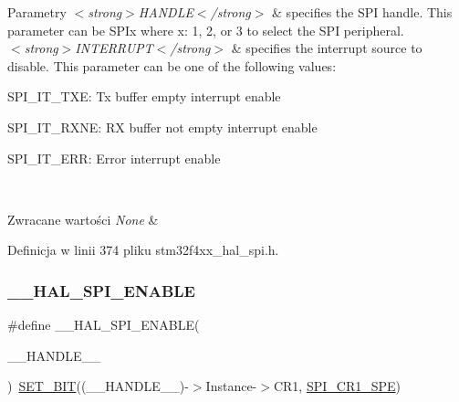 \begin{DoxyParams}{Parametry}
{\em $<$strong$>$\+H\+A\+N\+D\+L\+E$<$/strong$>$} & specifies the S\+PI handle. This parameter can be S\+P\+Ix where x\+: 1, 2, or 3 to select the S\+PI peripheral. \\
\hline
{\em $<$strong$>$\+I\+N\+T\+E\+R\+R\+U\+P\+T$<$/strong$>$} & specifies the interrupt source to disable. This parameter can be one of the following values\+: \begin{DoxyItemize}
\item S\+P\+I\+\_\+\+I\+T\+\_\+\+T\+XE\+: Tx buffer empty interrupt enable \item S\+P\+I\+\_\+\+I\+T\+\_\+\+R\+X\+NE\+: RX buffer not empty interrupt enable \item S\+P\+I\+\_\+\+I\+T\+\_\+\+E\+RR\+: Error interrupt enable \end{DoxyItemize}
\\
\hline
\end{DoxyParams}

\begin{DoxyRetVals}{Zwracane wartości}
{\em None} & \\
\hline
\end{DoxyRetVals}


Definicja w linii 374 pliku stm32f4xx\+\_\+hal\+\_\+spi.\+h.

\mbox{\label{group___s_p_i___exported___macros_ga16d2d73c2b16004499ae8d492e71fd4e}} 
\subsubsection{\texorpdfstring{\+\_\+\+\_\+\+H\+A\+L\+\_\+\+S\+P\+I\+\_\+\+E\+N\+A\+B\+LE}{\_\_HAL\_SPI\_ENABLE}}
{\footnotesize\ttfamily \#define \+\_\+\+\_\+\+H\+A\+L\+\_\+\+S\+P\+I\+\_\+\+E\+N\+A\+B\+LE(\begin{DoxyParamCaption}\item[{}]{\+\_\+\+\_\+\+H\+A\+N\+D\+L\+E\+\_\+\+\_\+ }\end{DoxyParamCaption})~\hyperlink{group___exported__macro_ga26474f43799fbade9cf300e21dd3a91a}{S\+E\+T\+\_\+\+B\+IT}((\+\_\+\+\_\+\+H\+A\+N\+D\+L\+E\+\_\+\+\_\+)-\/$>$Instance-\/$>$C\+R1, \hyperlink{group___peripheral___registers___bits___definition_gac5a646d978d3b98eb7c6a5d95d75c3f9}{S\+P\+I\+\_\+\+C\+R1\+\_\+\+S\+PE})}



